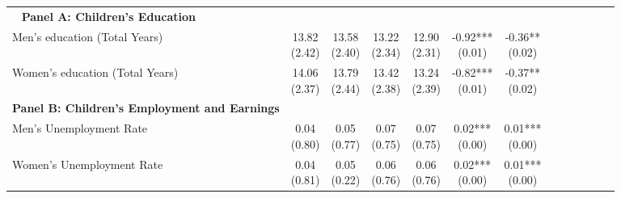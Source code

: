 \begin{landscape}
\begin{ThreePartTable}
\begin{longtable}[t]{>{\raggedright\arraybackslash}p{5cm}cccccc}
\midrule
\endhead
\midrule
\multicolumn{7}{r@{}}{\textit{(Continued on Next Page...)}}\
\endfoot
\bottomrule
\insertTableNotes
\endlastfoot
\textbf{Panel A: Children's Education} & \textbf{} & \textbf{} & \textbf{} & \textbf{} & \textbf{} & \textbf{}\\
\hspace{1em}Men’s education (Total Years) & \specialcell{13.82\\(2.42)} & \specialcell{13.58\\(2.40)} & \specialcell{13.22\\(2.34)} & \specialcell{12.90\\(2.31)} & \specialcell{-0.92***\\(0.01)} & \specialcell{-0.36**\\(0.02)}\\
\hspace{1em}Women’s education (Total Years) & \specialcell{14.06\\(2.37)} & \specialcell{13.79\\(2.44)} & \specialcell{13.42\\(2.38)} & \specialcell{13.24\\(2.39)} & \specialcell{-0.82***\\(0.01)} & \specialcell{-0.37**\\(0.02)}\\
\textbf{Panel B: Children's Employment and Earnings} & \textbf{} & \textbf{} & \textbf{} & \textbf{} & \textbf{} & \textbf{}\\
\hspace{1em}Men’s Unemployment Rate & \specialcell{0.04\\(0.80)} & \specialcell{0.05\\(0.77)} & \specialcell{0.07\\(0.75)} & \specialcell{0.07\\(0.75)} & \specialcell{0.02***\\(0.00)} & \specialcell{0.01***\\(0.00)}\\
\addlinespace
\hspace{1em}Women’s Unemployment Rate & \specialcell{0.04\\(0.81)} & \specialcell{0.05\\(0.22)} & \specialcell{0.06\\(0.76)} & \specialcell{0.06\\(0.76)} & \specialcell{0.02***\\(0.00)} & \specialcell{0.01***\\(0.00)}\\

\end{longtable}
\end{ThreePartTable}
\end{landscape}
